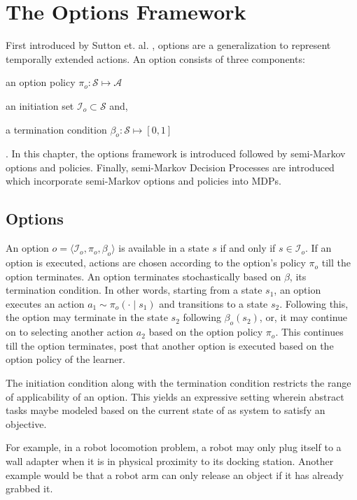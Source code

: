 \normallinespacing

\chapter{The Options Framework}

First introduced by Sutton et. al. \cite{sutton_between_1999}, options are a generalization to represent temporally extended actions.
An option consists of three components:
\begin{inparaenum}[(a)]
    \item an option policy $\pi_o : \mathcal{S} \mapsto \mathcal{A}$
    \item an initiation set $\mathcal{I}_o \subset \mathcal{S}$ and,
    \item a termination condition $\beta_o : \mathcal{S} \mapsto [0, 1]$
\end{inparaenum}.
In this chapter, the options framework is introduced followed by semi-Markov options and policies. 
Finally, semi-Markov Decision Processes are introduced which incorporate semi-Markov options and policies into MDPs.

\section{Options}

An option $o = \langle \mathcal{I}_o, \pi_o, \beta_o \rangle$ is available in a state $s$ if and only if $s \in \mathcal{I}_o$.
If an option is executed, actions are chosen according to the option's policy $\pi_o$ till the option terminates.
An option terminates stochastically based on $\beta$, its termination condition.
In other words, starting from a state $s_1$, an option executes an action $a_1 \sim \pi_o(\cdot \mid s_1)$ and transitions to a state $s_2$.
Following this, the option may terminate in the state $s_2$ following $\beta_o(s_2)$, or, it may continue on to selecting another action $a_2$ based on the option policy $\pi_o$.
This continues till the option terminates, post that another option is executed based on the option policy of the learner.

The initiation condition along with the termination condition restricts the range of applicability of an option.
This yields an expressive setting wherein abstract tasks maybe modeled based on the current state of as system to satisfy an objective.

For example, in a robot locomotion problem, a robot may only plug itself to a wall adapter when it is in physical proximity to its docking station.
Another example would be that a robot arm can only release an object if it has already grabbed it.

